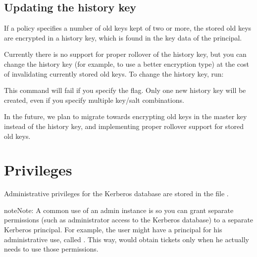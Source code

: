 \documentclass[letterpaper,10pt,english]{sphinxmanual}
\begin{document}
\subsection{Updating the history key}
\label{\detokenize{admin/database:updating-history-key}}\label{\detokenize{admin/database:updating-the-history-key}}
If a policy specifies a number of old keys kept of two or more, the
stored old keys are encrypted in a history key, which is found in the
key data of the  principal.

Currently there is no support for proper rollover of the history key,
but you can change the history key (for example, to use a better
encryption type) at the cost of invalidating currently stored old
keys.  To change the history key, run:

%
\begin{sphinxVerbatim}[commandchars=\\\{\}]
   
\end{sphinxVerbatim}

This command will fail if you specify the  flag.  Only one
new history key will be created, even if you specify multiple key/salt
combinations.

In the future, we plan to migrate towards encrypting old keys in the
master key instead of the history key, and implementing proper
rollover support for stored old keys.


\section{Privileges}
\label{\detokenize{admin/database:privileges}}\label{\detokenize{admin/database:id3}}
Administrative privileges for the Kerberos database are stored in the
file {\hyperref[\detokenize{admin/conf_files/kadm5_acl:kadm5-acl-5}]{}}.

\begin{sphinxadmonition}{note}{Note:}
A common use of an admin instance is so you can grant
separate permissions (such as administrator access to the
Kerberos database) to a separate Kerberos principal. For
example, the user  might have a principal for
his administrative use, called .  This
way,  would obtain  tickets
only when he actually needs to use those permissions.
\end{sphinxadmonition}
\end{document}
